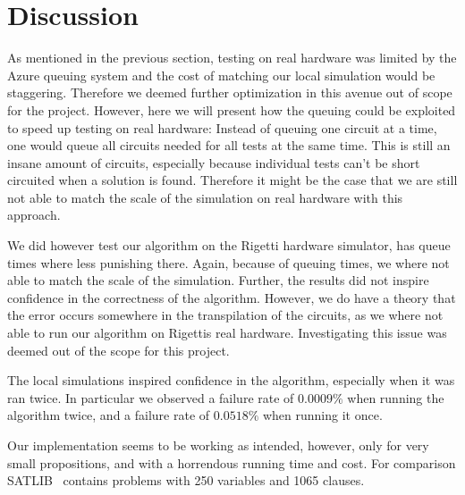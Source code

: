 \section{Discussion}\label{sec:discussion}

As mentioned in the previous section, testing on real hardware was limited by the Azure queuing system and the cost of matching our local simulation would be staggering.
Therefore we deemed further optimization in this avenue out of scope for the project.
However, here we will present how the queuing could be exploited to speed up testing on real hardware: Instead of queuing one circuit at a time, one would queue all circuits needed for all tests at the same time.
This is still an insane amount of circuits, especially because individual tests can't be short circuited when a solution is found.
Therefore it might be the case that we are still not able to match the scale of the simulation on real hardware with this approach.

We did however test our algorithm on the Rigetti hardware simulator, has queue times where less punishing there.
Again, because of queuing times, we where not able to match the scale of the simulation.
Further, the results did not inspire confidence in the correctness of the algorithm.
However, we do have a theory that the error occurs somewhere in the transpilation of the circuits, as we where not able to run our algorithm on Rigettis real hardware.
Investigating this issue was deemed out of the scope for this project.

The local simulations inspired confidence in the algorithm, especially when it was ran twice.
In particular we observed a failure rate of $0.0009\%$ when running the algorithm twice, and a failure rate of $0.0518\%$ when running it once.

Our implementation seems to be working as intended, however, only for very small propositions, and with a horrendous running time and cost.
For comparison SATLIB~\cite{hoos2000satlib} contains problems with 250 variables and 1065 clauses.
